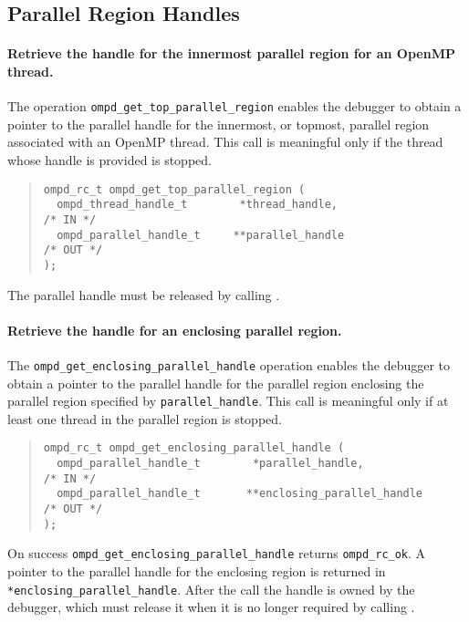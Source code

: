 \subsection{Parallel Region Handles}


\paragraph{Retrieve the handle for the innermost parallel region for an OpenMP 
thread.}
The  operation \verb|ompd_get_top_parallel_region|
enables the debugger to obtain a pointer to the parallel handle
for the innermost, or topmost,
parallel region associated with an OpenMP thread.
This call is meaningful only if the thread whose handle is provided is stopped.
 
\begin{quote}
\begin{lstlisting}
ompd_rc_t ompd_get_top_parallel_region (
  ompd_thread_handle_t        *thread_handle,                       /* IN */
  ompd_parallel_handle_t     **parallel_handle                     /* OUT */
);
\end{lstlisting}
\end{quote}
The parallel handle must be released by calling
.
 
\paragraph{Retrieve the handle for an enclosing parallel region.}
The  \verb|ompd_get_enclosing_parallel_handle|  operation enables
the debugger to obtain a pointer to the parallel handle for the parallel region
enclosing the parallel region specified by \verb|parallel_handle|.
This call is meaningful only if at least one thread in the parallel
region is stopped.

\begin{quote}
\begin{lstlisting}
ompd_rc_t ompd_get_enclosing_parallel_handle (
  ompd_parallel_handle_t        *parallel_handle,                   /* IN */
  ompd_parallel_handle_t       **enclosing_parallel_handle         /* OUT */
);
\end{lstlisting}
\end{quote}

On success \texttt{ompd\_get\_enclosing\_parallel\_handle}
returns \texttt{ompd\_rc\_ok}.
A pointer to the parallel handle for the enclosing region is
returned in \texttt{*enclosing\_parallel\_handle}.
After the call the handle is owned by the debugger,
which must release it when it is no longer required by calling
.

